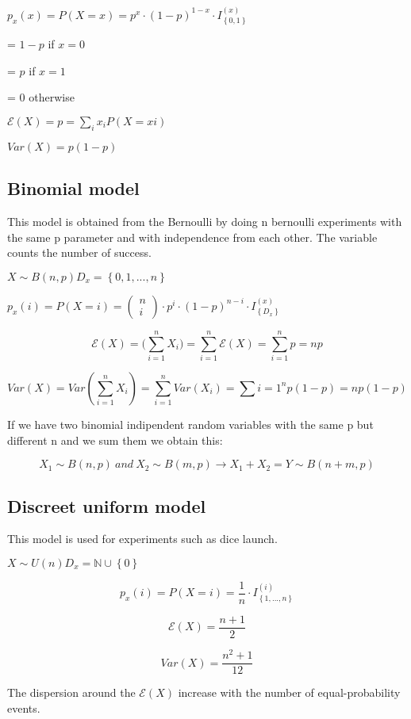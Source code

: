 \documentclass{article}
\begin{document}
$p_x(x) = P(X=x) = p^x \cdot(1-p)^{1-x} \cdot I_\left\{0,1\right\}^{(x)}$

= $1-p$ if $x = 0$ 

= $p$ if $x = 1$

= 0 otherwise
\bigskip

$\mathcal E(X) = p = \sum_{i}x_i P(X=xi)$

$Var(X)=p(1-p)$

\subsection{Binomial model}

This model is obtained from the Bernoulli by doing n bernoulli experiments with the same p parameter and with independence from each other. The variable counts the number of success.

$X \sim B(n,p) D_x = \left\{0,1,...,n\right\}$
\bigskip

$p_x(i) = P(X=i) = \left(\begin{array}{c} n \\ i \end{array} \right) \cdot p^i \cdot (1-p)^{n-i}\cdot I_\left\{D_x\right\}^{(x)}$
\bigskip

$$\mathcal E(X) = \mathcal(\sum_{i=1}^n X_i) = \sum_{i=1}^n \mathcal E(X) = \sum_{i=1}^n p = np$$

$$Var(X) = Var(\sum_{i=1}^n X_i) = \sum_{i=1}^nVar(X_i) = \sum{i=1}^np(1-p) = np(1-p)$$
\bigskip

If we have two binomial indipendent random variables with the same p but different n and we sum them we obtain this:

$$X_1 \sim B(n,p) \ and \ X_2 \sim B(m,p) \rightarrow X_1 + X_2 = Y \sim B(n+m,p)$$


\subsection{Discreet uniform model}

This model is used for experiments such as dice launch.

$X \sim U(n) D_x = \mathbb{N} \cup \left\{0\right\}$

$$p_x(i) = P(X = i) = \frac{1}{n} \cdot I_\left\{1,...,n\right\}^(i)$$
\bigskip

$$\mathcal E(X) = \frac{n+1}{2}$$

$$Var(X) = \frac{n^2 +1}{12}$$

The dispersion around the $\mathcal E(X)$ increase with the number of equal-probability events.
\end{document}
